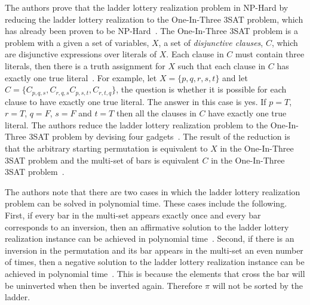\pagebreak
The authors prove that the ladder lottery realization problem in NP-Hard
by reducing the ladder lottery realization to the One-In-Three 3SAT problem, 
which has already been proven to be NP-Hard~\cite{A3}. The One-In-Three 3SAT 
problem is a problem with a given a set of variables, $X$, a set 
of \emph{disjunctive clauses}, $C$, which are disjunctive expressions over 
literals of $X$. Each clause in $C$ 
must contain three literals, then there is a truth assignment for $X$ such that 
each clause in $C$ has exactly one true literal~\cite{A17}. For example, let 
$X=\{p, q, r, s, t\}$ and let $C=\{C_{p,q,s}, C_{r,q,s} C_{p,s,t}, C_{r,t,q}\}$,
the question is whether it is possible for each clause to have exactly one
true literal. The answer in this case is yes. If $p=T$, $r=T$, $q=F$, $s=F$
 and $t=T$ then all the clauses in $C$ have exactly one true literal. 
 The authors reduce the ladder lottery realization problem to the
One-In-Three 3SAT problem by devising four gadgets~\cite{A3}. The result of 
the reduction is that the arbitrary starting permutation is equivalent 
to $X$ in the One-In-Three 3SAT 
problem and the multi-set of bars is equivalent $C$ in the One-In-Three 
3SAT problem~\cite{A3}.\par 
The authors note that there are two cases in which the ladder lottery
realization problem can be solved in polynomial time. These cases 
include the following. First, if every bar in the multi-set appears
exactly once and every bar corresponds to an inversion, 
then an affirmative solution to the ladder lottery realization 
instance can be achieved in polynomial time~\cite{A3}. 
Second, if there is an inversion in the permutation and its bar appears in the multi-set an even 
number of times, then a negative solution to
the ladder lottery realization instance
can be achieved in polynomial time~\cite{A3}. This is because the elements that cross the bar will 
be uninverted when then be inverted again. Therefore $\pi$ will not be sorted by the ladder.\par